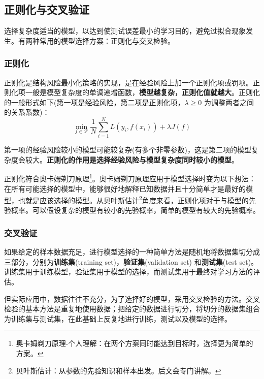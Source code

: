 \subsection{正则化与交叉验证}

选择复杂度适当的模型，以达到使测试误差最小的学习目的，避免过拟合现象发生。有两种常用的模型选择方案：正则化与交叉检验。

\subsubsection{正则化}

正则化是结构风险最小化策略的实现，是在经验风险上加一个正则化项或罚项。正则化项一般是模型复杂度的单调递增函数，\textbf{模型越复杂，正则化值就越大}。正则化的一般形式如下(第一项是经验风险，第二项是正则化项，$\lambda\geq0$ 为调整两者之间的关系系数)：
\begin{equation}
    \underset{f\in \mathcal{F}}{\min} \frac{1}{N}\sum_{i=1}^{N} L(y_i,f(x_i))+\lambda J(f)
\end{equation}

第一项的经验风险较小的模型可能较复杂(有多个非零参数)，这是第二项的模型复杂度会较大。\textbf{正则化的作用是选择经验风险与模型复杂度同时较小的模型}。

正则化符合奥卡姆剃刀原理\footnote{奥卡姆剃刀原理-个人理解：在两个方案同时能达到目标时，选择更为简单的方案。}。奥卡姆剃刀原理应用于模型选择时变为以下想法：在所有可能选择的模型中，能够很好地解释已知数据并且十分简单才是最好的模型，也就是应该选择的模型。从贝叶斯估计\footnote{贝叶斯估计：从参数的先验知识和样本出发。后文会专门讲解。}角度来看，正则化项对于与模型的先验概率。可以假设复杂的模型有较小的先验概率，简单的模型有较大的先验概率。

\subsubsection{交叉验证}

如果给定的样本数据充足，进行模型选择的一种简单方法是随机地将数据集切分成三部分，分别为\textbf{训练集}(training set)，\textbf{验证集}(validation set) 和\textbf{测试集}(test set)。训练集用于训练模型，验证集用于模型的选择，而测试集用于最终对学习方法的评估。

但实际应用中，数据往往不充分，为了选择好的模型，采用交叉检验的方法。交叉检验的基本方法是重复地使用数据；把给定的数据进行切分，将切分的数据集组合为训练集与测试集，在此基础上反复地进行训练，测试以及模型的选择。

